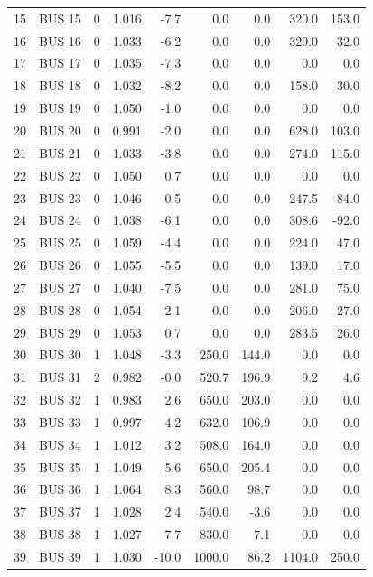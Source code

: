 \documentclass[12pt]{classe_uftex/uftex}
\begin{document}
\begin{longtable}{rllrrrrrr}
15 & BUS 15 & 0 & 1.016 & -7.7 & 0.0 & 0.0 & 320.0 & 153.0 \\
16 & BUS 16 & 0 & 1.033 & -6.2 & 0.0 & 0.0 & 329.0 & 32.0 \\
17 & BUS 17 & 0 & 1.035 & -7.3 & 0.0 & 0.0 & 0.0 & 0.0 \\
18 & BUS 18 & 0 & 1.032 & -8.2 & 0.0 & 0.0 & 158.0 & 30.0 \\
19 & BUS 19 & 0 & 1.050 & -1.0 & 0.0 & 0.0 & 0.0 & 0.0 \\
20 & BUS 20 & 0 & 0.991 & -2.0 & 0.0 & 0.0 & 628.0 & 103.0 \\
21 & BUS 21 & 0 & 1.033 & -3.8 & 0.0 & 0.0 & 274.0 & 115.0 \\
22 & BUS 22 & 0 & 1.050 & 0.7 & 0.0 & 0.0 & 0.0 & 0.0 \\
23 & BUS 23 & 0 & 1.046 & 0.5 & 0.0 & 0.0 & 247.5 & 84.0 \\
24 & BUS 24 & 0 & 1.038 & -6.1 & 0.0 & 0.0 & 308.6 & -92.0 \\
25 & BUS 25 & 0 & 1.059 & -4.4 & 0.0 & 0.0 & 224.0 & 47.0 \\
26 & BUS 26 & 0 & 1.055 & -5.5 & 0.0 & 0.0 & 139.0 & 17.0 \\
27 & BUS 27 & 0 & 1.040 & -7.5 & 0.0 & 0.0 & 281.0 & 75.0 \\
28 & BUS 28 & 0 & 1.054 & -2.1 & 0.0 & 0.0 & 206.0 & 27.0 \\
29 & BUS 29 & 0 & 1.053 & 0.7 & 0.0 & 0.0 & 283.5 & 26.0 \\
30 & BUS 30 & 1 & 1.048 & -3.3 & 250.0 & 144.0 & 0.0 & 0.0 \\
31 & BUS 31 & 2 & 0.982 & -0.0 & 520.7 & 196.9 & 9.2 & 4.6 \\
32 & BUS 32 & 1 & 0.983 & 2.6 & 650.0 & 203.0 & 0.0 & 0.0 \\
33 & BUS 33 & 1 & 0.997 & 4.2 & 632.0 & 106.9 & 0.0 & 0.0 \\
34 & BUS 34 & 1 & 1.012 & 3.2 & 508.0 & 164.0 & 0.0 & 0.0 \\
35 & BUS 35 & 1 & 1.049 & 5.6 & 650.0 & 205.4 & 0.0 & 0.0 \\
36 & BUS 36 & 1 & 1.064 & 8.3 & 560.0 & 98.7 & 0.0 & 0.0 \\
37 & BUS 37 & 1 & 1.028 & 2.4 & 540.0 & -3.6 & 0.0 & 0.0 \\
38 & BUS 38 & 1 & 1.027 & 7.7 & 830.0 & 7.1 & 0.0 & 0.0 \\
39 & BUS 39 & 1 & 1.030 & -10.0 & 1000.0 & 86.2 & 1104.0 & 250.0 \\
\end{longtable}
\normalsize
\end{document}
